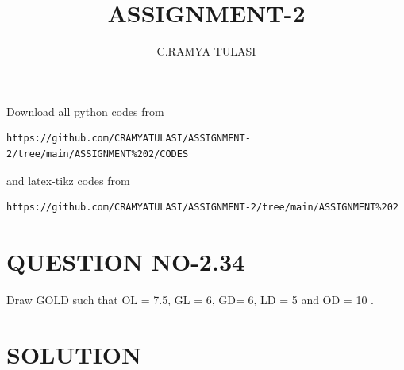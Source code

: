 \documentclass[journal,12pt,twocolumn]{IEEEtran}
\begin{document}
     \def\rightbox#1{\makebox[0in][r]{#1}}
     \def\centbox#1{\makebox[0in]{#1}}
     \def\topbox#1{\raisebox{-\baselineskip}[0in][0in]{#1}}
     \def\midbox#1{\raisebox{-0.5\baselineskip}[0in][0in]{#1}}
\vspace{3cm}
\title{ASSIGNMENT-2}
\author{C.RAMYA TULASI}
\maketitle
\newpage
\bigskip
\renewcommand{\thefigure}{\theenumi}
\renewcommand{\thetable}{\theenumi}
Download all python codes from 
\begin{lstlisting}
https://github.com/CRAMYATULASI/ASSIGNMENT-2/tree/main/ASSIGNMENT%202/CODES
\end{lstlisting}
%
and latex-tikz codes from 
%
\begin{lstlisting}
https://github.com/CRAMYATULASI/ASSIGNMENT-2/tree/main/ASSIGNMENT%202
\end{lstlisting}
%
\section{QUESTION NO-2.34}
\item Draw GOLD such that OL = 7.5, GL = 6, GD= 6, LD = 5 and OD = 10 .
%
%
\section{SOLUTION}
 
\end{document}
